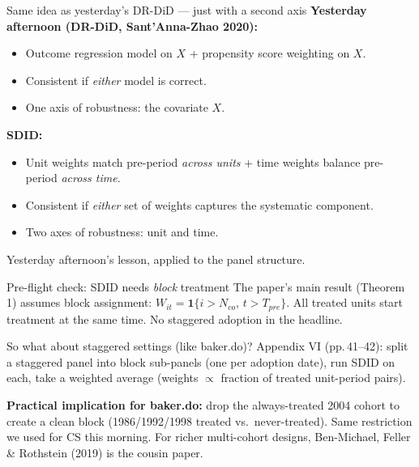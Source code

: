 \documentclass[aspectratio=169,11pt]{beamer}
\begin{document}
\begin{frame}{Same idea as yesterday's DR-DiD --- just with a second axis}
\vspace{0.6em}
\textbf{Yesterday afternoon (DR-DiD, Sant'Anna-Zhao 2020):} \;
\begin{itemize}\small
  \item Outcome regression model on $X$ \;+\; propensity score weighting on $X$.
  \item Consistent if \textit{either} model is correct.
  \item One axis of robustness: the covariate $X$.
\end{itemize}

\vspace{0.7em}
\textbf{SDID:} \;
\begin{itemize}\small
  \item Unit weights match pre-period \textit{across units} \;+\; time weights balance pre-period \textit{across time}.
  \item Consistent if \textit{either} set of weights captures the systematic component.
  \item Two axes of robustness: unit and time.
\end{itemize}

\vspace{0.6em}
 \;Yesterday afternoon's lesson, applied to the panel structure.
\end{frame}


\begin{frame}{Pre-flight check: SDID needs \textit{block} treatment}
\footnotesize
The paper's main result (Theorem 1) assumes block assignment: \;$W_{it} = \mathbf{1}\{i > N_{co},\, t > T_{pre}\}$. \;All treated units start treatment at the same time. No staggered adoption in the headline.

\vspace{0.5em}
\begin{block}{So what about staggered settings (like baker.do)?}
Appendix VI (pp.\,41--42): split a staggered panel into block sub-panels (one per adoption date), run SDID on each, take a weighted average (weights $\propto$ fraction of treated unit-period pairs).
\end{block}

\vspace{0.4em}
\textbf{Practical implication for baker.do:} drop the always-treated 2004 cohort to create a clean block (1986/1992/1998 treated vs.\ never-treated). \;Same restriction we used for CS this morning. \;For richer multi-cohort designs, Ben-Michael, Feller \& Rothstein (2019) is the cousin paper.
\end{frame}
\end{document}
